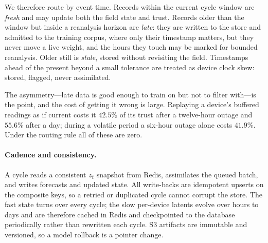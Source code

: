 \documentclass[10pt]{article}
\begin{document}
We therefore route by event time. Records within the current cycle window are
\emph{fresh} and may update both the field state and trust. Records older than the
window but inside a reanalysis horizon are \emph{late}: they are written to the
store and admitted to the training corpus, where only their timestamp matters, but
they never move a live weight, and the hours they touch may be marked for bounded
reanalysis. Older still is \emph{stale}, stored without revisiting the field.
Timestamps ahead of the present beyond a small tolerance are treated as device
clock skew: stored, flagged, never assimilated.

The asymmetry---late data is good enough to train on but not to filter with---is
the point, and the cost of getting it wrong is large. Replaying a device's
buffered readings as if current costs it $42.5\%$ of its trust after a twelve-hour
outage and $55.6\%$ after a day; during a volatile period a six-hour outage alone
costs $41.9\%$. Under the routing rule all of these are zero.

\paragraph{Cadence and consistency.}
A cycle reads a consistent $z_t$ snapshot from Redis, assimilates the queued
batch, and writes forecasts and updated state. All write-backs are idempotent
upserts on the composite keys, so a retried or duplicated cycle cannot corrupt the
store. The fast state turns over every cycle; the slow per-device latents evolve
over hours to days and are therefore cached in Redis and checkpointed to the
database periodically rather than rewritten each cycle. S3 artifacts are immutable and
versioned, so a model rollback is a pointer change.
\end{document}
